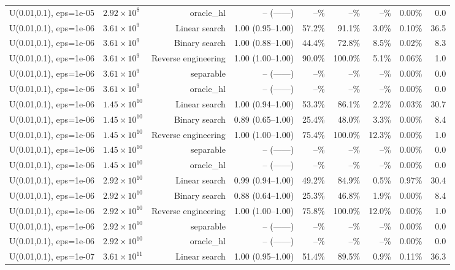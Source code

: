 \begin{tabular}{llrrrrrrr}
U(0.01,0.1), eps=1e-05 & $2.92\times 10^{8}$ & oracle_hl & -- (------) & --\% & --\% & --\% & 0.00\% & 0.0 \\
U(0.01,0.1), eps=1e-06 & $3.61\times 10^{9}$ & Linear search & 1.00 (0.95--1.00) & 57.2\% & 91.1\% & 3.0\% & 0.10\% & 36.5 \\
U(0.01,0.1), eps=1e-06 & $3.61\times 10^{9}$ & Binary search & 1.00 (0.88--1.00) & 44.4\% & 72.8\% & 8.5\% & 0.02\% & 8.3 \\
U(0.01,0.1), eps=1e-06 & $3.61\times 10^{9}$ & Reverse engineering & 1.00 (1.00--1.00) & 90.0\% & 100.0\% & 5.1\% & 0.06\% & 1.0 \\
U(0.01,0.1), eps=1e-06 & $3.61\times 10^{9}$ & separable & -- (------) & --\% & --\% & --\% & 0.00\% & 0.0 \\
U(0.01,0.1), eps=1e-06 & $3.61\times 10^{9}$ & oracle_hl & -- (------) & --\% & --\% & --\% & 0.00\% & 0.0 \\
U(0.01,0.1), eps=1e-06 & $1.45\times 10^{10}$ & Linear search & 1.00 (0.94--1.00) & 53.3\% & 86.1\% & 2.2\% & 0.03\% & 30.7 \\
U(0.01,0.1), eps=1e-06 & $1.45\times 10^{10}$ & Binary search & 0.89 (0.65--1.00) & 25.4\% & 48.0\% & 3.3\% & 0.00\% & 8.4 \\
U(0.01,0.1), eps=1e-06 & $1.45\times 10^{10}$ & Reverse engineering & 1.00 (1.00--1.00) & 75.4\% & 100.0\% & 12.3\% & 0.00\% & 1.0 \\
U(0.01,0.1), eps=1e-06 & $1.45\times 10^{10}$ & separable & -- (------) & --\% & --\% & --\% & 0.00\% & 0.0 \\
U(0.01,0.1), eps=1e-06 & $1.45\times 10^{10}$ & oracle_hl & -- (------) & --\% & --\% & --\% & 0.00\% & 0.0 \\
U(0.01,0.1), eps=1e-06 & $2.92\times 10^{10}$ & Linear search & 0.99 (0.94--1.00) & 49.2\% & 84.9\% & 0.5\% & 0.97\% & 30.4 \\
U(0.01,0.1), eps=1e-06 & $2.92\times 10^{10}$ & Binary search & 0.88 (0.64--1.00) & 25.3\% & 46.8\% & 1.9\% & 0.00\% & 8.4 \\
U(0.01,0.1), eps=1e-06 & $2.92\times 10^{10}$ & Reverse engineering & 1.00 (1.00--1.00) & 75.8\% & 100.0\% & 12.0\% & 0.00\% & 1.0 \\
U(0.01,0.1), eps=1e-06 & $2.92\times 10^{10}$ & separable & -- (------) & --\% & --\% & --\% & 0.00\% & 0.0 \\
U(0.01,0.1), eps=1e-06 & $2.92\times 10^{10}$ & oracle_hl & -- (------) & --\% & --\% & --\% & 0.00\% & 0.0 \\
U(0.01,0.1), eps=1e-07 & $3.61\times 10^{11}$ & Linear search & 1.00 (0.95--1.00) & 51.4\% & 89.5\% & 0.9\% & 0.11\% & 36.3 \\

\end{tabular}
